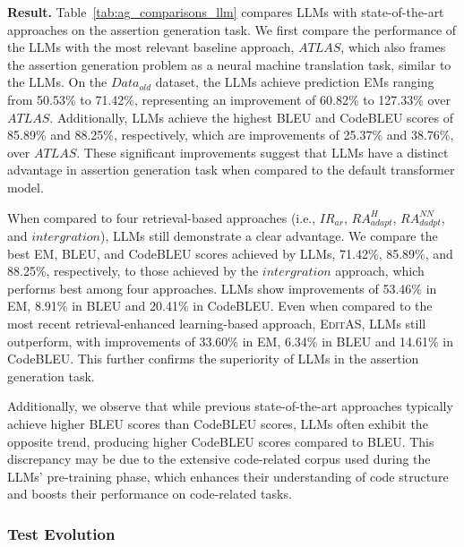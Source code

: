 \textbf{Result.}
Table~\ref{tab:ag_comparisons_llm} compares LLMs with state-of-the-art approaches on the assertion generation task. 
We first compare the performance of the LLMs with the most relevant baseline approach, $ATLAS$, which also frames the assertion generation problem as a neural machine translation task, similar to the LLMs. 
On the $Data_{old}$ dataset, the LLMs achieve prediction EMs ranging from 50.53\% to 71.42\%, representing an improvement of 60.82\% to 127.33\% over $ATLAS$. 
Additionally, LLMs achieve the highest BLEU and CodeBLEU scores of 85.89\% and 88.25\%, respectively, which are improvements of 25.37\% and 38.76\%, over $ATLAS$. 
These significant improvements suggest that LLMs have a distinct advantage in assertion generation task when compared to the default transformer model. 



When compared to four retrieval-based approaches (i.e., $IR_{ar}$, $RA_{adapt}^H$, $RA_{dadpt}^{NN}$, and $intergration$), LLMs still demonstrate a clear advantage. 
We compare the best EM, BLEU, and CodeBLEU scores achieved by LLMs,  71.42\%, 85.89\%, and 88.25\%, respectively, to those achieved by the $intergration$ approach, which performs best among four approaches.
LLMs show improvements of 53.46\% in EM, 8.91\% in BLEU and 20.41\% in CodeBLEU. 
Even when compared to the most recent retrieval-enhanced learning-based approach, \textsc{EditAS}, LLMs still outperform, with improvements of 33.60\% in EM, 6.34\% in BLEU and 14.61\% in CodeBLEU. 
This further confirms the superiority of LLMs in the assertion generation task. 


Additionally, we observe that while previous state-of-the-art approaches typically achieve higher BLEU scores than CodeBLEU scores, LLMs often exhibit the opposite trend, producing higher CodeBLEU scores compared to BLEU. 
This discrepancy may be due to the extensive code-related corpus used during the LLMs’ pre-training phase, which enhances their understanding of code structure and boosts their performance on code-related tasks.




\subsubsection{Test Evolution}
\label{sec:rq1-test-evolution}

